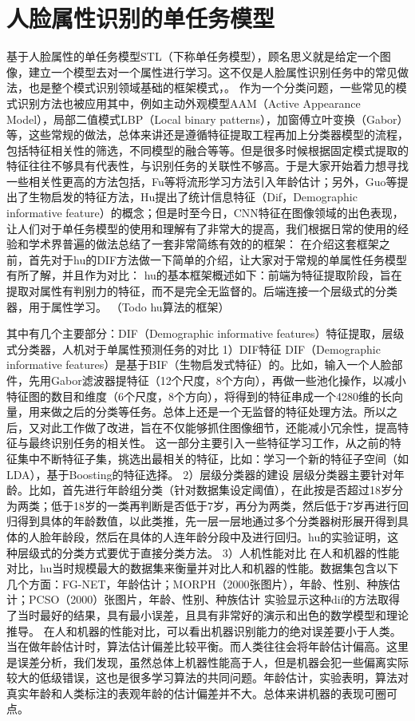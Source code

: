 \section{人脸属性识别的单任务模型}
基于人脸属性的单任务模型STL（下称单任务模型），顾名思义就是给定一个图像，建立一个模型去对一个属性进行学习。这不仅是人脸属性识别任务中的常见做法，也是整个模式识别领域基础的框架模式，。
作为一个分类问题，一些常见的模式识别方法也被应用其中，例如主动外观模型AAM（Active  Appearance  Model），局部二值模式LBP（Local binary patterns），加窗傅立叶变换（Gabor）等，这些常规的做法，总体来讲还是遵循特征提取工程再加上分类器模型的流程，包括特征相关性的筛选，不同模型的融合等等。但是很多时候根据固定模式提取的特征往往不够具有代表性，与识别任务的关联性不够高。于是大家开始着力想寻找一些相关性更高的方法包括，Fu等将流形学习方法引入年龄估计；另外，Guo等提出了生物启发的特征方法，Hu提出了统计信息特征（Dif，Demographic informative feature）的概念；但是时至今日，CNN特征在图像领域的出色表现，让人们对于单任务模型的使用和理解有了非常大的提高，我们根据日常的使用的经验和学术界普遍的做法总结了一套非常简练有效的的框架：
在介绍这套框架之前，首先对于hu的DIF方法做一下简单的介绍，让大家对于常规的单属性任务模型有所了解，并且作为对比：
hu的基本框架概述如下：前端为特征提取阶段，旨在提取对属性有判别力的特征，而不是完全无监督的。后端连接一个层级式的分类器，用于属性学习。
（Todo hu算法的框架）

其中有几个主要部分：DIF（Demographic informative features）特征提取，层级式分类器，人机对于单属性预测任务的对比
1）DIF特征
DIF（Demographic informative features）是基于BIF（生物启发式特征）的。比如，输入一个人脸部件，先用Gabor滤波器提特征（12个尺度，8个方向），再做一些池化操作，以减小特征图的数目和维度（6个尺度，8个方向），将得到的特征串成一个4280维的长向量，用来做之后的分类等任务。总体上还是一个无监督的特征处理方法。所以之后，又对此工作做了改进，旨在不仅能够抓住图像细节，还能减小冗余性，提高特征与最终识别任务的相关性。
这一部分主要引入一些特征学习工作，从之前的特征集中不断特征子集，挑选出最相关的特征，比如：学习一个新的特征子空间（如LDA），基于Boosting的特征选择。
2）层级分类器的建设
层级分类器主要针对年龄。比如，首先进行年龄组分类（针对数据集设定阈值），在此按是否超过18岁分为两类；低于18岁的一类再判断是否低于7岁，再分为两类，然后低于7岁再进行回归得到具体的年龄数值，以此类推，先一层一层地通过多个分类器树形展开得到具体的人脸年龄段，然后在具体的人连年龄分段中及进行回归。hu的实验证明，这种层级式的分类方式要优于直接分类方法。
3）人机性能对比
在人和机器的性能对比，hu当时规模最大的数据集来衡量并对比人和机器的性能。数据集包含以下几个方面：FG-NET，年龄估计；MORPH（2000张图片），年龄、性别、种族估计；PCSO（2000）张图片，年龄、性别、种族估计
实验显示这种dif的方法取得了当时最好的结果，具有最小误差，且具有非常好的演示和出色的数学模型和理论推导。
在人和机器的性能对比，可以看出机器识别能力的绝对误差要小于人类。当在做年龄估计时，算法估计偏差比较平衡。而人类往往会将年龄估计偏高。这里是误差分析，我们发现，虽然总体上机器性能高于人，但是机器会犯一些偏离实际较大的低级错误，这也是很多学习算法的共同问题。年龄估计，实验表明，算法对真实年龄和人类标注的表观年龄的估计偏差并不大。总体来讲机器的表现可圈可点。

